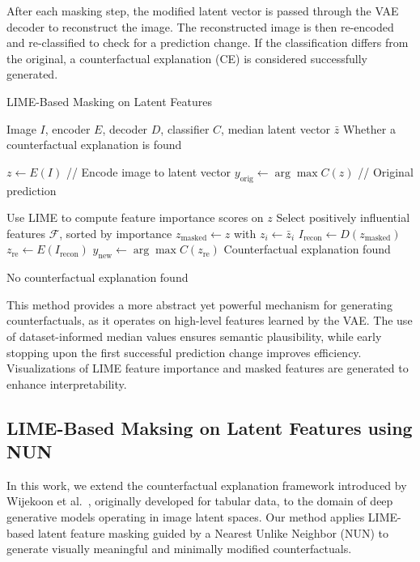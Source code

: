 After each masking step, the modified latent vector is passed through the VAE decoder to reconstruct the image. The reconstructed image is then re-encoded and re-classified to check for a prediction change. If the classification differs from the original, a counterfactual explanation (CE) is considered successfully generated.

\vspace{1em}
\begin{algorithm}[H]
\caption{LIME-Based Masking on Latent Features}
\label{alg:lime_on_latent}
\begin{algorithmic}[1]
\REQUIRE Image $I$, encoder $E$, decoder $D$, classifier $C$, median latent vector $\bar{z}$
\ENSURE Whether a counterfactual explanation is found

\STATE $z \leftarrow E(I)$ \hfill // Encode image to latent vector
\STATE $y_{\text{orig}} \leftarrow \arg\max C(z)$ \hfill // Original prediction

\STATE Use LIME to compute feature importance scores on $z$
\STATE Select positively influential features $\mathcal{F}$, sorted by importance
    \STATE $z_{\text{masked}} \leftarrow z$ with $z_i \leftarrow \bar{z}_i$
    \STATE $I_{\text{recon}} \leftarrow D(z_{\text{masked}})$
    \STATE $z_{\text{re}} \leftarrow E(I_{\text{recon}})$
    \STATE $y_{\text{new}} \leftarrow \arg\max C(z_{\text{re}})$
        \RETURN Counterfactual explanation found
    \ENDIF
\ENDFOR

\RETURN No counterfactual explanation found
\end{algorithmic}
\end{algorithm}
\vspace{1em}

This method provides a more abstract yet powerful mechanism for generating counterfactuals, as it operates on high-level features learned by the VAE. The use of dataset-informed median values ensures semantic plausibility, while early stopping upon the first successful prediction change improves efficiency. Visualizations of LIME feature importance and masked features are generated to enhance interpretability.






\subsection{LIME-Based Maksing on Latent Features using NUN} \label{lime_with_NUN}
In this work, we extend the counterfactual explanation framework introduced by Wijekoon et al.~\cite{WijekoonWNMPC21}, originally developed for tabular data, to the domain of deep generative models operating in image latent spaces. Our method applies LIME-based latent feature masking guided by a Nearest Unlike Neighbor (NUN) to generate visually meaningful and minimally modified counterfactuals.

